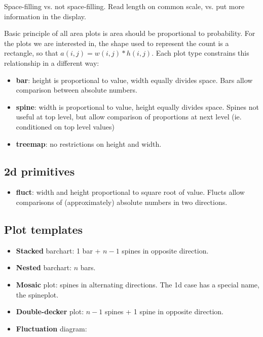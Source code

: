 \documentclass[letterpaper,oneside]{scrartcl}
\begin{document}
Space-filling vs. not space-filling.  Read length on common scale, vs. put more information in the display.

Basic principle of all area plots is area should be proportional to probability. For the plots we are interested in, the shape used to represent the count is a rectangle, so that $a(i, j) = w(i, j) * h(i, j)$. Each plot type constrains this relationship in a different way:

\begin{itemize}
  \item {\bf bar}: height is proportional to value, width equally divides space. Bars allow comparison between absolute numbers.

  \item {\bf spine}: width is proportional to value, height equally divides space. Spines not useful at top level, but allow comparison of proportions at next level (ie. conditioned on top level values)

  \item {\bf treemap}: no restrictions on height and width.

\end{itemize}

\subsection{2d primitives}

\begin{itemize}
  \item {\bf fluct}: width and height proportional to square root of value. Flucts allow comparisons of (approximately) absolute numbers in two directions. 
  
\end{itemize}

\subsection{Plot templates}

\begin{itemize}
  \item {\bf Stacked} barchart: 1 bar + $n-1$ spines in opposite direction.
  \item {\bf Nested} barchart: $n$ bars.
  \item {\bf Mosaic} plot: spines in alternating directions.  The 1d case has a special name, the spineplot.
  \item {\bf Double-decker} plot: $n-1$ spines + 1 spine in opposite direction.
  
  \item {\bf Fluctuation} diagram: 
\end{itemize}
\end{document}
